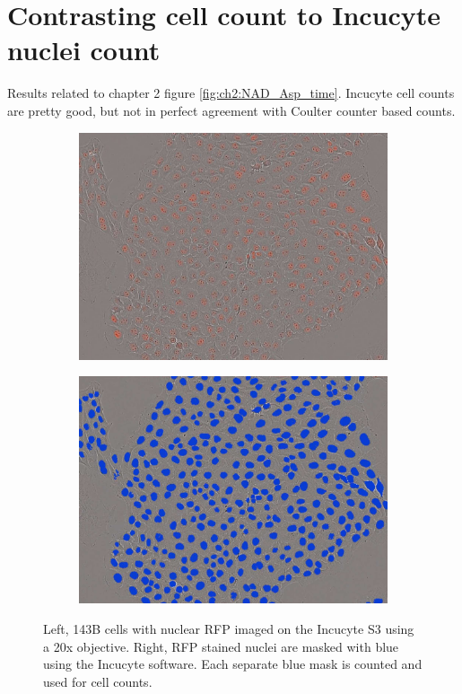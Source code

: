 \FloatBarrier
\section{Contrasting cell count to Incucyte nuclei count}
Results related to chapter 2 figure \ref{fig:ch2:NAD_Asp_time}.
Incucyte cell counts are pretty good, but not in perfect agreement with Coulter counter based counts.

\begin{figure}[ht]
     \centering
     \begin{subfigure}[b]{0.3\textwidth}
         \includegraphics[width=\textwidth]{figures/sapp/IC/143B-Nuc_RFP.jpg}
     \end{subfigure}
     \begin{subfigure}[b]{0.3\textwidth}
         \includegraphics[width=\textwidth]{figures/sapp/IC/143B-Nuc_RFP_count.jpg}
     \end{subfigure}
        \caption[Incucyte RFP nuclei count in 143B.]{
        Left, 143B cells with nuclear RFP imaged on the Incucyte S3 using a 20x objective.
        Right, RFP stained nuclei are masked with blue using the Incucyte software.
        Each separate blue mask is counted and used for cell counts.
        }
        \label{fig:sapp:IC:143B_Nuc_RFP_ICimg}
\end{figure}

